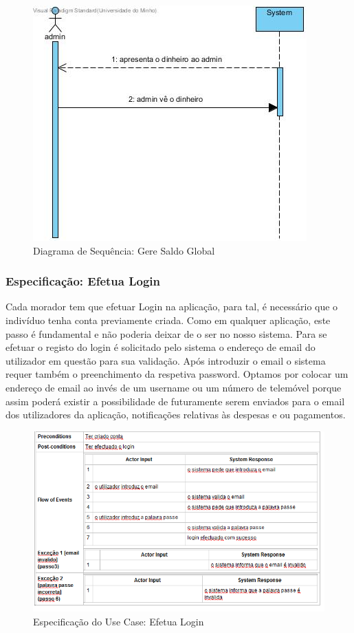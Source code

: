 \begin{figure}[htb!]
	\centering
	\includegraphics[scale=0.5]{imagens/diagramaSeq/GereSaldoGlobal}  
	\caption{Diagrama de Sequência: Gere Saldo Global}  
\end{figure}


\subsubsection{Especificação: Efetua Login }
Cada morador tem que efetuar Login na aplicação, para tal, é necessário que o indivíduo tenha conta previamente criada. Como em qualquer aplicação, este passo é fundamental e não poderia deixar de o ser no nosso sistema. Para se efetuar o registo do login é solicitado pelo sistema o endereço de email do utilizador em questão para sua validação. Após introduzir o email o sistema requer também o preenchimento da respetiva password. Optamos por colocar um endereço de email ao invés de um username ou um número de telemóvel porque assim poderá existir a possibilidade de futuramente serem enviados para o email dos utilizadores da aplicação, notificações relativas às despesas e ou pagamentos.

\begin{figure}[htb!]
	\centering
	\includegraphics[scale=0.6]{imagens/Especificacoes/efetualogin}  
	\caption{Especificação do Use Case: Efetua Login  }  
\end{figure}


